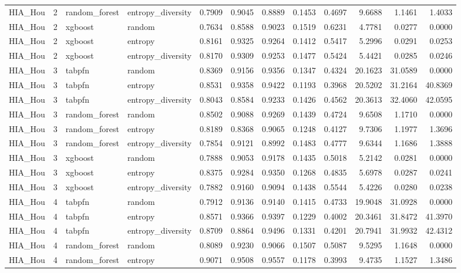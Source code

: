 \begin{tabular}{lrllrrrrrrrr}
HIA_Hou & 2 & random_forest & entropy_diversity & 0.7909 & 0.9045 & 0.8889 & 0.1453 & 0.4697 & 9.6688 & 1.1461 & 1.4033 \\
HIA_Hou & 2 & xgboost & random & 0.7634 & 0.8588 & 0.9023 & 0.1519 & 0.6231 & 4.7781 & 0.0277 & 0.0000 \\
HIA_Hou & 2 & xgboost & entropy & 0.8161 & 0.9325 & 0.9264 & 0.1412 & 0.5417 & 5.2996 & 0.0291 & 0.0253 \\
HIA_Hou & 2 & xgboost & entropy_diversity & 0.8170 & 0.9309 & 0.9253 & 0.1477 & 0.5424 & 5.4421 & 0.0285 & 0.0246 \\
HIA_Hou & 3 & tabpfn & random & 0.8369 & 0.9156 & 0.9356 & 0.1347 & 0.4324 & 20.1623 & 31.0589 & 0.0000 \\
HIA_Hou & 3 & tabpfn & entropy & 0.8531 & 0.9358 & 0.9422 & 0.1193 & 0.3968 & 20.5202 & 31.2164 & 40.8369 \\
HIA_Hou & 3 & tabpfn & entropy_diversity & 0.8043 & 0.8584 & 0.9233 & 0.1426 & 0.4562 & 20.3613 & 32.4060 & 42.0595 \\
HIA_Hou & 3 & random_forest & random & 0.8502 & 0.9088 & 0.9269 & 0.1439 & 0.4724 & 9.6508 & 1.1710 & 0.0000 \\
HIA_Hou & 3 & random_forest & entropy & 0.8189 & 0.8368 & 0.9065 & 0.1248 & 0.4127 & 9.7306 & 1.1977 & 1.3696 \\
HIA_Hou & 3 & random_forest & entropy_diversity & 0.7854 & 0.9121 & 0.8992 & 0.1483 & 0.4777 & 9.6344 & 1.1686 & 1.3888 \\
HIA_Hou & 3 & xgboost & random & 0.7888 & 0.9053 & 0.9178 & 0.1435 & 0.5018 & 5.2142 & 0.0281 & 0.0000 \\
HIA_Hou & 3 & xgboost & entropy & 0.8375 & 0.9284 & 0.9350 & 0.1268 & 0.4835 & 5.6978 & 0.0287 & 0.0241 \\
HIA_Hou & 3 & xgboost & entropy_diversity & 0.7882 & 0.9160 & 0.9094 & 0.1438 & 0.5544 & 5.4226 & 0.0280 & 0.0238 \\
HIA_Hou & 4 & tabpfn & random & 0.7912 & 0.9136 & 0.9140 & 0.1415 & 0.4733 & 19.9048 & 31.0928 & 0.0000 \\
HIA_Hou & 4 & tabpfn & entropy & 0.8571 & 0.9366 & 0.9397 & 0.1229 & 0.4002 & 20.3461 & 31.8472 & 41.3970 \\
HIA_Hou & 4 & tabpfn & entropy_diversity & 0.8709 & 0.8864 & 0.9496 & 0.1331 & 0.4201 & 20.7941 & 31.9932 & 42.4312 \\
HIA_Hou & 4 & random_forest & random & 0.8089 & 0.9230 & 0.9066 & 0.1507 & 0.5087 & 9.5295 & 1.1648 & 0.0000 \\
HIA_Hou & 4 & random_forest & entropy & 0.9071 & 0.9508 & 0.9557 & 0.1178 & 0.3993 & 9.4735 & 1.1527 & 1.3486 \\

\end{tabular}
